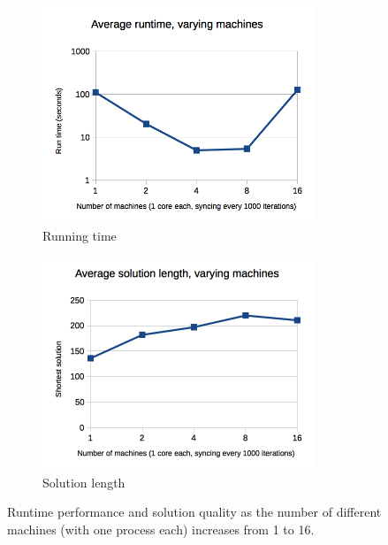 \documentclass{article}
\begin{document}
\begin{figure}
\centering
\begin{subfigure}{3.2in}
  \includegraphics[width=3.2in]{graphs/nummachines_runningtime}
  \caption{Running time}
  \label{fig:nummachines_runtime}
\end{subfigure}
\begin{subfigure}{3.2in}
  \includegraphics[width=3.2in]{graphs/nummachines_solutionquality}
  \caption{Solution length}
  \label{fig:nummachines_solnqual}
\end{subfigure}
\caption{Runtime performance and solution quality as the number of different machines (with one process each) increases from 1 to 16.}
\label{fig:nummachines}
\end{figure}
\end{document}

